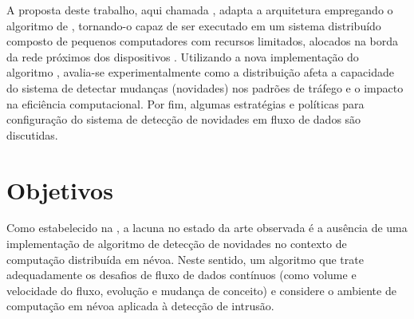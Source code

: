 
A proposta deste trabalho, aqui chamada \mfog, adapta a arquitetura \arch \cite{Cassales2019a}
empregando o algoritmo de \nd \minas \cite{Faria2016minas}, tornando-o capaz
de ser executado em um sistema distribuído composto de pequenos computadores com
recursos limitados, alocados na borda da rede próximos dos dispositivos \iot.
Utilizando a nova implementação do algoritmo \minas, avalia-se experimentalmente
como a distribuição afeta a capacidade do sistema de detectar mudanças
(novidades) nos padrões de tráfego e o impacto na eficiência computacional.
Por fim, algumas estratégias e políticas para configuração do sistema de
detecção de novidades em fluxo de dados são discutidas.

\section{Objetivos}\label{sec:objetivos}

Como estabelecido na , a lacuna no estado da arte observada é a
ausência de uma implementação de algoritmo de detecção de novidades no contexto
de computação distribuída em névoa.
Neste sentido, um algoritmo que trate adequadamente os desafios de fluxo de
dados contínuos (como volume e velocidade do fluxo, evolução e mudança de
conceito) e considere o ambiente de computação em névoa aplicada à detecção de
intrusão.

